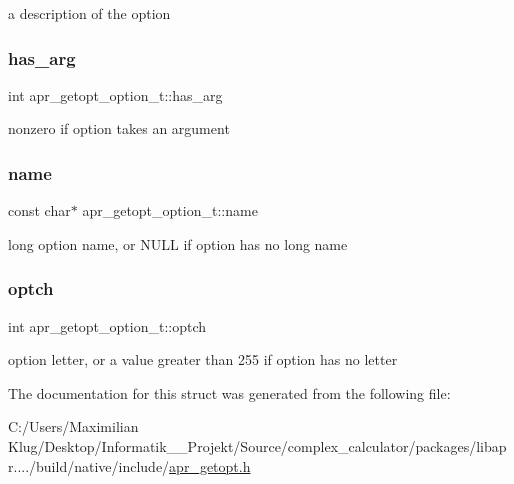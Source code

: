 a description of the option \mbox{\label{structapr__getopt__option__t_aac65dae93f6d35f4848b91f6f9d66278}} 
\subsubsection{\texorpdfstring{has\+\_\+arg}{has\_arg}}
{\footnotesize\ttfamily int apr\+\_\+getopt\+\_\+option\+\_\+t\+::has\+\_\+arg}

nonzero if option takes an argument \mbox{\label{structapr__getopt__option__t_a7e623913c9761495c5d37adf6ff1ee69}} 
\subsubsection{\texorpdfstring{name}{name}}
{\footnotesize\ttfamily const char$\ast$ apr\+\_\+getopt\+\_\+option\+\_\+t\+::name}

long option name, or N\+U\+LL if option has no long name \mbox{\label{structapr__getopt__option__t_a476e67c4dde620fe5b4f5952238c6e94}} 
\subsubsection{\texorpdfstring{optch}{optch}}
{\footnotesize\ttfamily int apr\+\_\+getopt\+\_\+option\+\_\+t\+::optch}

option letter, or a value greater than 255 if option has no letter 

The documentation for this struct was generated from the following file\+:\begin{DoxyCompactItemize}
\item 
C\+:/\+Users/\+Maximilian Klug/\+Desktop/\+Informatik\+\_\+\_\+\+Projekt/\+Source/complex\+\_\+calculator/packages/libapr..../build/native/include/\mbox{\hyperlink{apr__getopt_8h}{apr\+\_\+getopt.\+h}}\end{DoxyCompactItemize}
